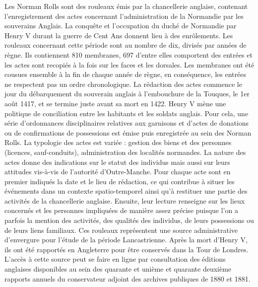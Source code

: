 \documentclass[a4paper,12pt,twoside]{book}
\begin{document}
    \medskip
        
    Les Norman Rolls sont des rouleaux émis par la chancellerie anglaise, contenant l’enregistrement des actes concernant l’administration de la Normandie par les souverains Anglais. 
               La conquête et l’occupation du duché de Normandie par Henry V durant la guerre de Cent Ans donnent lieu à des enrôlements. 
               Les rouleaux concernant cette période sont au nombre de dix, divisés par années de règne. 
               Ils contiennent 810 membranes, 697 d’entre elles comportent des entrées et les actes sont recopiés à la fois sur les faces et les dorsales. 
               Les membranes ont été cousues ensemble à la fin de chaque année de règne, en conséquence, les entrées ne respectent pas un ordre chronologique. 
               La rédaction des actes commence le jour du débarquement du souverain anglais à l'embouchure de la Touques, le 1er août 1417, et se termine juste avant sa mort en 1422. 
               Henry V mène une politique de conciliation entre les habitants et les soldats anglais. 
               Pour cela, une série d'ordonnances disciplinaires relatives aux garnisons et d’actes de donations ou de confirmations de possessions est émise puis enregistrée au sein des Norman Rolls. 
               La typologie des actes est variée : gestion des biens et des personnes (licences, sauf-conduits), administration des localités normandes. 
               La nature des actes donne des indications sur le statut des individus mais aussi sur leurs attitudes vis-à-vis de l’autorité d’Outre-Manche. 
               Pour chaque acte sont en premier indiqués la date et le lieu de rédaction, ce qui contribue à situer les événements dans un contexte spatio-temporel ainsi qu’à restituer une partie des activités de la chancellerie anglaise. 
               Ensuite, leur lecture renseigne sur les lieux concernés et les personnes impliquées de manière assez précise puisque l’on a parfois la mention des activités, des qualités des individus, de leurs possessions ou de leurs liens familiaux. 
               Ces rouleaux représentent une source administrative d’envergure pour l’étude de la période Lancastrienne. 
               Après la mort d’Henry V, ils ont été rapportés en Angleterre pour être conservés dans la Tour de Londres. 
               L’accès à cette source peut se faire en ligne par consultation des éditions anglaises disponibles au sein des quarante et unième et quarante deuxième rapports annuels du conservateur adjoint des archives publiques de 1880 et 1881. 
        
\end{document}
